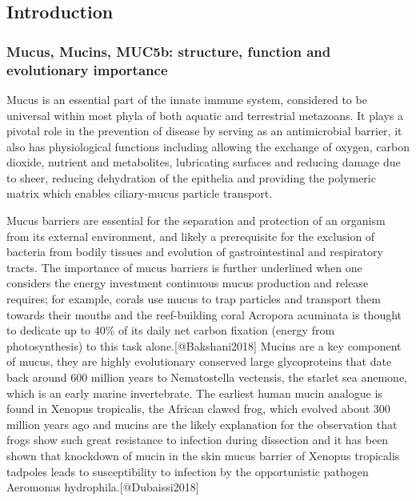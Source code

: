 \documentclass[
]{article}
\begin{document}
\hypertarget{introduction-3}{%
\subsection{Introduction}\label{introduction-3}}

\hypertarget{mucus-mucins-muc5b-structure-function-and-evolutionary-importance}{%
\subsubsection{Mucus, Mucins, MUC5b: structure, function and
evolutionary
importance}\label{mucus-mucins-muc5b-structure-function-and-evolutionary-importance}}

Mucus is an essential part of the innate immune system, considered to be
universal within most phyla of both aquatic and terrestrial metazoans.
It plays a pivotal role in the prevention of disease by serving as an
antimicrobial barrier, it also has physiological functions including
allowing the exchange of oxygen, carbon dioxide, nutrient and
metabolites, lubricating surfaces and reducing damage due to sheer,
reducing dehydration of the epithelia and providing the polymeric matrix
which enables ciliary-mucus particle transport.

Mucus barriers are essential for the separation and protection of an
organism from its external environment, and likely a prerequisite for
the exclusion of bacteria from bodily tissues and evolution of
gastrointestinal and respiratory tracts. The importance of mucus
barriers is further underlined when one considers the energy investment
continuous mucus production and release requires; for example, corals
use mucus to trap particles and transport them towards their mouths and
the reef-building coral Acropora acuminata is thought to dedicate up to
40\% of its daily net carbon fixation (energy from photosynthesis) to
this task alone.{[}@Bakshani2018{]} Mucins are a key component of mucus,
they are highly evolutionary conserved large glycoproteins that date
back around 600 million years to Nematostella vectensis, the starlet sea
anemone, which is an early marine invertebrate. The earliest human mucin
analogue is found in Xenopus tropicalis, the African clawed frog, which
evolved about 300 million years ago and mucins are the likely
explanation for the observation that frogs show such great resistance to
infection during dissection and it has been shown that knockdown of
mucin in the skin mucus barrier of Xenopus tropicalis tadpoles leads to
susceptibility to infection by the opportunistic pathogen Aeromonas
hydrophila.{[}@Dubaissi2018{]}
\end{document}
